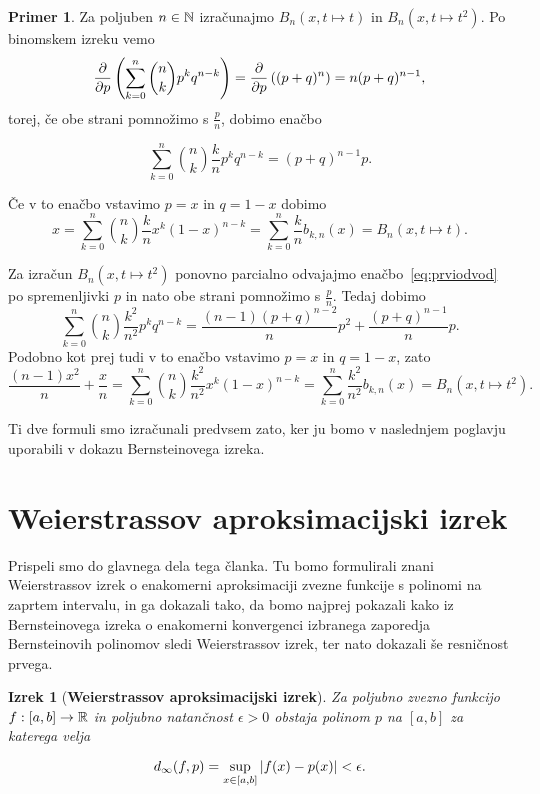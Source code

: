 \documentclass[a4paper, reqno]{amsart}
\theoremstyle{theorem}
\newtheorem{izrek}{Izrek}[section]
\theoremstyle{definition}
\newtheorem{primer}[definicija]{Primer}
\begin{document}
\begin{primer}
	\label{B polinom primer}
	\cite{Kadison}
	Za poljuben $n \in \mathbb{N}$ izračunajmo $B_n(x, t \mapsto t)$ in $B_n(x, t \mapsto t^2)$. 
	Po binomskem izreku vemo
$$
\pdv{p}\left( \sum_{k=0}^n \binom nk p^k q^{n-k}\right) = \pdv{p}\left((p + q)^n\right) =
n (p + q)^{n - 1}\text{,}
$$
torej, če obe strani pomnožimo s $\frac pn$, dobimo enačbo

\begin{equation}
	\sum_{k=0}^n \binom nk \frac kn p^k q^{n-k} = (p + q)^{n - 1}p\text{.}
	\label{eq:prviodvod}
\end{equation}

Če v to enačbo vstavimo $p = x$ in $q = 1 - x$ dobimo
$$
x = \sum_{k=0}^n \binom nk \frac kn x^k (1 - x)^{n-k} = 
\sum_{k = 0}^n \frac kn b_{k,n}(x) =
B_n(x, t \mapsto t)\text{.}
$$

Za izračun $B_n(x, t \mapsto t^2)$ ponovno parcialno odvajajmo 
enačbo~\eqref{eq:prviodvod} po spremenljivki $p$ in nato obe strani
pomnožimo s $\frac pn$. Tedaj dobimo
$$
\sum_{k=0}^n \binom nk \frac {k^2}{n^2} p^k q^{n-k} = 
\frac {(n - 1)(p + q)^{n - 2}}{n}p^2 + \frac{(p + q)^{n - 1}}{n}p\text{.}
$$
Podobno kot prej tudi v to enačbo vstavimo $p = x$ in $q = 1 - x$, zato
$$
\frac{(n - 1)x^2}{n} + \frac xn = 
\sum_{k=0}^n \binom nk \frac {k^2}{n^2} x^k (1 - x)^{n-k} = 
\sum_{k = 0}^n \frac{k^2}{n^2} b_{k,n}(x) =
B_n(x, t \mapsto t^2)\text{.}
$$

Ti dve formuli smo izračunali predvsem zato, ker ju bomo v naslednjem poglavju uporabili
v dokazu Bernsteinovega izreka.
\end{primer}


\section{Weierstrassov aproksimacijski izrek}

\par
Prispeli smo do glavnega dela tega članka. Tu bomo formulirali znani Weierstrassov
izrek o enakomerni aproksimaciji zvezne funkcije s polinomi na zaprtem intervalu,
in ga dokazali tako, da bomo najprej pokazali kako iz Bernsteinovega izreka o 
enakomerni konvergenci izbranega zaporedja Bernsteinovih polinomov sledi 
Weierstrassov izrek, ter nato dokazali še resničnost prvega. 

\begin{izrek}[\textbf{Weierstrassov aproksimacijski izrek}]
	\label{Weierstrass}
	Za poljubno zvezno funkcijo $f: [a, b] \to \mathbb{R}$ in poljubno natančnost $\epsilon > 0$
	obstaja polinom $p$ na $[a,b]$ za katerega velja

	$$ d_{\infty}(f, p) = \sup_{x \in [a, b]} |f(x)-p(x)| < \epsilon\text{.}$$
	
\end{izrek}
	
\end{document}
